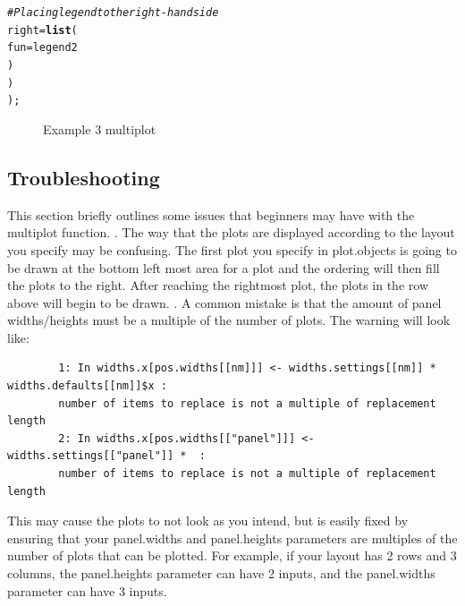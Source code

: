 \documentclass[letterpaper]{article}\usepackage[]{graphicx}\usepackage[]{color}
\makeatletter
\newcommand{\hlcom}[1]{\textcolor[rgb]{0.678,0.584,0.686}{\textit{#1}}}%
\newcommand{\hlstd}[1]{\textcolor[rgb]{0.345,0.345,0.345}{#1}}%
\newcommand{\hlkwc}[1]{\textcolor[rgb]{0.333,0.667,0.333}{#1}}%
\newcommand{\hlkwd}[1]{\textcolor[rgb]{0.737,0.353,0.396}{\textbf{#1}}}%
\newenvironment{kframe}{%
 \def\at@end@of@kframe{}%
 \ifinner\ifhmode%
  \def\at@end@of@kframe{\end{minipage}}%
  \begin{minipage}{\columnwidth}%
 \fi\fi%
 \def\FrameCommand##1{\hskip\@totalleftmargin \hskip-\fboxsep
 \colorbox{shadecolor}{##1}\hskip-\fboxsep
     \hskip-\linewidth \hskip-\@totalleftmargin \hskip\columnwidth}%
 \MakeFramed {\advance\hsize-\width
   \@totalleftmargin\z@ \linewidth\hsize
   \@setminipage}}%
 {\par\unskip\endMakeFramed%
 \at@end@of@kframe}
\newenvironment{knitrout}{}{} %
\makeatother
\begin{document}
\begin{knitrout}
\begin{kframe}
\begin{alltt}
        \hlcom{# Placing legend to the right-hand side}
        \hlkwc{right} \hlstd{=} \hlkwd{list}\hlstd{(}
                \hlkwc{fun} \hlstd{= legend2}
                \hlstd{)}
        \hlstd{)}
    \hlstd{);}
\end{alltt}
\end{kframe}\begin{figure}[]


{\centering {} 

}

\caption[Example 3 multiplot]{Example 3 multiplot\label{fig:multiplotex3_final}}
\end{figure}


\end{knitrout}

\subsection{Troubleshooting}
This section briefly outlines some issues that beginners may have with the multiplot function. 
\newline
{}. The way that the plots are displayed according to the layout you specify may be confusing. The first plot you specify in plot.objects is going to be drawn at the bottom left most area for a plot and the ordering will then fill the plots to the right. After reaching the rightmost plot, the plots in the row above will begin to be drawn. 
\newline
{}. A common mistake is that the amount of panel widths/heights must be a multiple of the number of plots. The warning will look like:

\begin{verbatim}
        1: In widths.x[pos.widths[[nm]]] <- widths.settings[[nm]] * widths.defaults[[nm]]$x : 
        number of items to replace is not a multiple of replacement length
        2: In widths.x[pos.widths[["panel"]]] <- widths.settings[["panel"]] *  :
        number of items to replace is not a multiple of replacement length
\end{verbatim}

This may cause the plots to not look as you intend, but is easily fixed by ensuring that your panel.widths and panel.heights parameters are multiples of the number of plots that can be plotted. For example, if your layout has 2 rows and 3 columns, the panel.heights parameter can have 2 inputs, and the panel.widths parameter can have 3 inputs.
\end{document}
